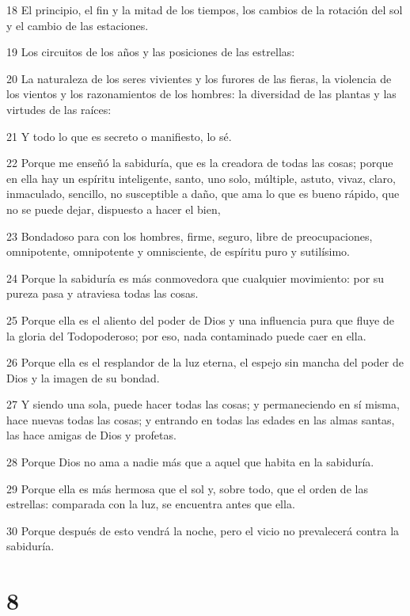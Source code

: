 \par 18 El principio, el fin y la mitad de los tiempos, los cambios de la rotación del sol y el cambio de las estaciones.
\par 19 Los circuitos de los años y las posiciones de las estrellas:
\par 20 La naturaleza de los seres vivientes y los furores de las fieras, la violencia de los vientos y los razonamientos de los hombres: la diversidad de las plantas y las virtudes de las raíces:
\par 21 Y todo lo que es secreto o manifiesto, lo sé.
\par 22 Porque me enseñó la sabiduría, que es la creadora de todas las cosas; porque en ella hay un espíritu inteligente, santo, uno solo, múltiple, astuto, vivaz, claro, inmaculado, sencillo, no susceptible a daño, que ama lo que es bueno rápido, que no se puede dejar, dispuesto a hacer el bien,
\par 23 Bondadoso para con los hombres, firme, seguro, libre de preocupaciones, omnipotente, omnipotente y omnisciente, de espíritu puro y sutilísimo.
\par 24 Porque la sabiduría es más conmovedora que cualquier movimiento: por su pureza pasa y atraviesa todas las cosas.
\par 25 Porque ella es el aliento del poder de Dios y una influencia pura que fluye de la gloria del Todopoderoso; por eso, nada contaminado puede caer en ella.
\par 26 Porque ella es el resplandor de la luz eterna, el espejo sin mancha del poder de Dios y la imagen de su bondad.
\par 27 Y siendo una sola, puede hacer todas las cosas; y permaneciendo en sí misma, hace nuevas todas las cosas; y entrando en todas las edades en las almas santas, las hace amigas de Dios y profetas.
\par 28 Porque Dios no ama a nadie más que a aquel que habita en la sabiduría.
\par 29 Porque ella es más hermosa que el sol y, sobre todo, que el orden de las estrellas: comparada con la luz, se encuentra antes que ella.
\par 30 Porque después de esto vendrá la noche, pero el vicio no prevalecerá contra la sabiduría.

\chapter{8}

